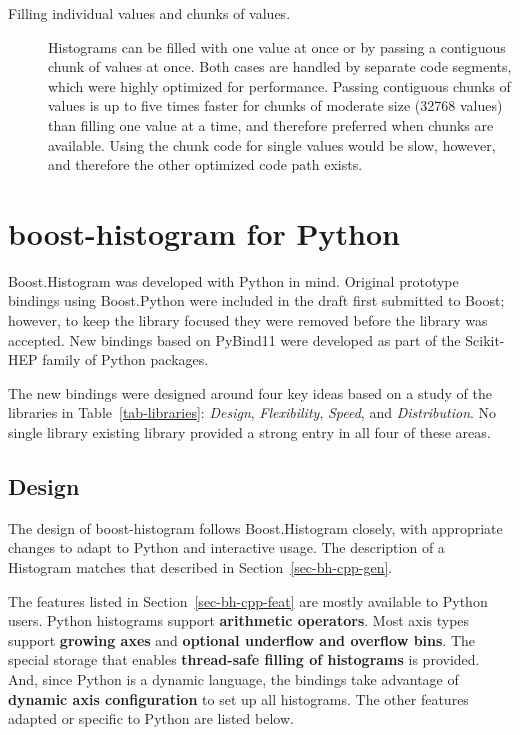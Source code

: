 \documentclass{webofc}
\begin{document}
\begin{description}
\item[Filling individual values and chunks of values.] Histograms can be filled with one value at once or by passing a contiguous chunk of values at once. Both cases are handled by separate code segments, which were highly optimized for performance. Passing contiguous chunks of values is up to five times faster for chunks of moderate size (32768 values) than filling one value at a time, and therefore preferred when chunks are available. Using the chunk code for single values would be slow, however, and therefore the other optimized code path exists.
\end{description}

\section{boost-histogram for Python}
\label{sec-bhp-intro}

Boost.Histogram was developed with Python in mind. Original prototype bindings using Boost.Python were included in the draft first submitted to Boost; however, to keep the library focused they were removed before the library was accepted. New bindings based on PyBind11 were developed as part of the Scikit-HEP family of Python packages.

The new bindings were designed around four key ideas based on a study of the libraries in Table~\ref{tab-libraries}: \emph{Design}, \emph{Flexibility}, \emph{Speed}, and \emph{Distribution}. No single library existing library provided a strong entry in all four of these areas.

\subsection{Design}
\label{sec-bhp-design}

The design of boost-histogram follows Boost.Histogram closely, with appropriate changes to adapt to Python and interactive usage. The description of a Histogram matches that described in Section~\ref{sec-bh-cpp-gen}.

The features listed in Section~\ref{sec-bh-cpp-feat} are mostly available to Python users. Python histograms support \textbf{arithmetic operators}. Most axis types support \textbf{growing axes} and \textbf{optional underflow and overflow bins}. The special storage that enables \textbf{thread-safe filling of histograms} is provided. And, since Python is a dynamic language, the bindings take advantage of \textbf{dynamic axis configuration} to set up all histograms. The other features adapted or specific to Python are listed below.
\end{document}
